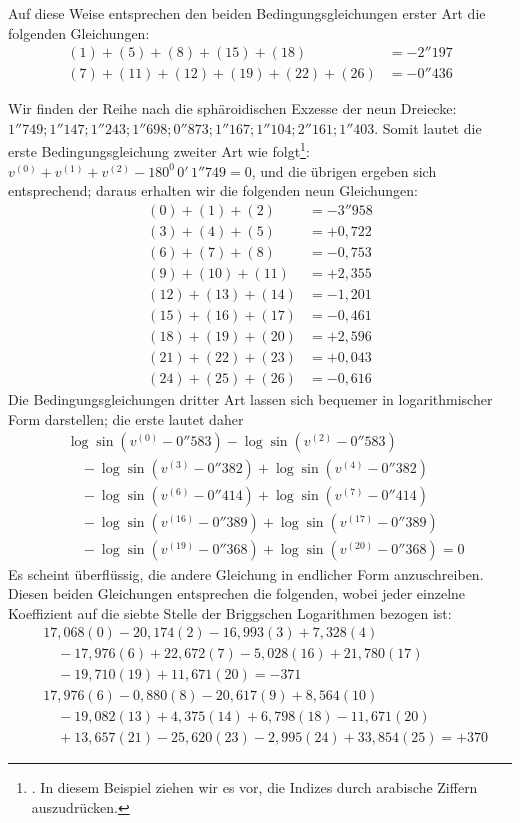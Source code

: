 Auf diese Weise entsprechen den beiden Bedingungsgleichungen erster Art die folgenden Gleichungen:
\[
\begin{aligned}
(1)+(5)+(8)+(15)+(18)&=-2''197\\
(7)+(11)+(12)+(19)+(22)+(26)&=-0''436
\end{aligned}
\]

Wir finden der Reihe nach die sphäroidischen Exzesse der neun Dreiecke: \(1''749;\allowbreak1''147;\allowbreak1''243;\allowbreak1''698;\allowbreak0''873;\allowbreak1''167;\allowbreak1''104;\allowbreak2''161;\allowbreak1''403\). Somit lautet die erste Bedingungsgleichung zweiter Art wie folgt\footnote{. In diesem Beispiel ziehen wir es vor, die Indizes durch arabische Ziffern auszudrücken.}: \(v^{(0)}+v^{(1)}+v^{(2)}-180^0\,0'\,1''749=0\), und die übrigen ergeben sich entsprechend; daraus erhalten wir die folgenden neun Gleichungen:
\[
\begin{aligned}
(0)+(1)+(2)&=-3''958\\
(3)+(4)+(5)&=+0{,}722\\
(6)+(7)+(8)&=-0{,}753\\
(9)+(10)+(11)&=+2{,}355\\
(12)+(13)+(14)&=-1{,}201\\
(15)+(16)+(17)&=-0{,}461\\
(18)+(19)+(20)&=+2{,}596\\
(21)+(22)+(23)&=+0{,}043\\
(24)+(25)+(26)&=-0{,}616
\end{aligned}
\]
Die Bedingungsgleichungen dritter Art lassen sich bequemer in logarithmischer Form darstellen; die erste lautet daher
\[
\begin{aligned}
&\log\sin(v^{(0)}-0''583)-\log\sin(v^{(2)}-0''583)\\
&\quad-\log\sin(v^{(3)}-0''382)+\log\sin(v^{(4)}-0''382)\\
&\quad-\log\sin(v^{(6)}-0''414)+\log\sin(v^{(7)}-0''414)\\
&\quad-\log\sin(v^{(16)}-0''389)+\log\sin(v^{(17)}-0''389)\\
&\quad-\log\sin(v^{(19)}-0''368)+\log\sin(v^{(20)}-0''368)=0
\end{aligned}
\]
Es scheint überflüssig, die andere Gleichung in endlicher Form anzuschreiben. Diesen beiden Gleichungen entsprechen die folgenden, wobei jeder einzelne Koeffizient auf die siebte Stelle der Briggschen Logarithmen bezogen ist:
\[
\begin{aligned}
&17{,}068(0)-20{,}174(2)-16{,}993(3)+7{,}328(4)\\
&\quad-17{,}976(6)+22{,}672(7)-5{,}028(16)+21{,}780(17)\\
&\quad-19{,}710(19)+11{,}671(20)=-371\\[5pt]
&17{,}976(6)-0{,}880(8)-20{,}617(9)+8{,}564(10)\\
&\quad-19{,}082(13)+4{,}375(14)+6{,}798(18)-11{,}671(20)\\
&\quad+13{,}657(21)-25{,}620(23)-2{,}995(24)+33{,}854(25)=+370
\end{aligned}
\]

